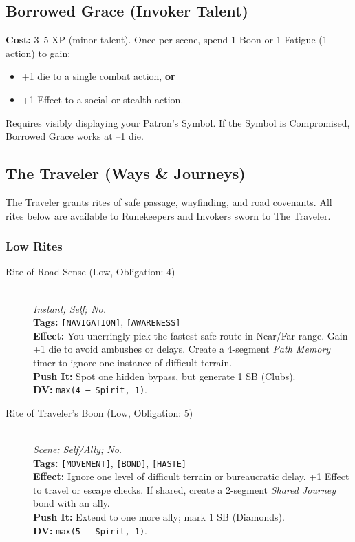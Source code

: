 \subsection{Borrowed Grace (Invoker Talent)}
\textbf{Cost:} 3--5 XP (minor talent). Once per scene, spend 1 Boon or 1 Fatigue (1 action) to gain:
\begin{itemize}
  \item +1 die to a single combat action, \textbf{or}
  \item +1 Effect to a social or stealth action.
\end{itemize}
Requires visibly displaying your Patron's Symbol. If the Symbol is Compromised, Borrowed Grace works at --1 die.

\subsection{The Traveler (Ways \& Journeys)}

The Traveler grants rites of safe passage, wayfinding, and road covenants. All rites below are available to Runekeepers and Invokers sworn to The Traveler.

\subsubsection{Low Rites}

\begin{description}
  \item[Rite of Road-Sense (Low, Obligation: 4)] \hfill \\
  \textit{Instant; Self; No.} \\
  \textbf{Tags:} \texttt{[NAVIGATION]}, \texttt{[AWARENESS]} \\
  \textbf{Effect:} You unerringly pick the fastest safe route in Near/Far range. Gain +1 die to avoid ambushes or delays. Create a 4-segment \textit{Path Memory} timer to ignore one instance of difficult terrain. \\
  \textbf{Push It:} Spot one hidden bypass, but generate 1 SB (Clubs). \\
  \textbf{DV:} \texttt{max(4 -- Spirit, 1)}.

  \item[Rite of Traveler's Boon (Low, Obligation: 5)] \hfill \\
  \textit{Scene; Self/Ally; No.} \\
  \textbf{Tags:} \texttt{[MOVEMENT]}, \texttt{[BOND]}, \texttt{[HASTE]} \\
  \textbf{Effect:} Ignore one level of difficult terrain or bureaucratic delay. +1 Effect to travel or escape checks. If shared, create a 2-segment \textit{Shared Journey} bond with an ally. \\
  \textbf{Push It:} Extend to one more ally; mark 1 SB (Diamonds). \\
  \textbf{DV:} \texttt{max(5 -- Spirit, 1)}.
\end{description}

